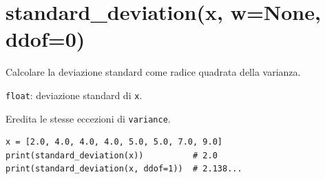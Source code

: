 \section{\texorpdfstring{standard\_deviation(x, w=None, ddof=0)}{standard\_deviation(x, w=None, ddof=0)}}
\label{sec:standard-deviation}
\begin{apidesc}
  \item[\textbf{Scopo}]
    Calcolare la deviazione standard come radice quadrata della varianza.
  \item[\textbf{Restituisce}]
    \texttt{float}: deviazione standard di \texttt{x}.
  \item[\textbf{Eccezioni}]
    Eredita le stesse eccezioni di \texttt{variance}.
\end{apidesc}

\begin{verbatim}
x = [2.0, 4.0, 4.0, 4.0, 5.0, 5.0, 7.0, 9.0]
print(standard_deviation(x))          # 2.0
print(standard_deviation(x, ddof=1))  # 2.138...
\end{verbatim}
